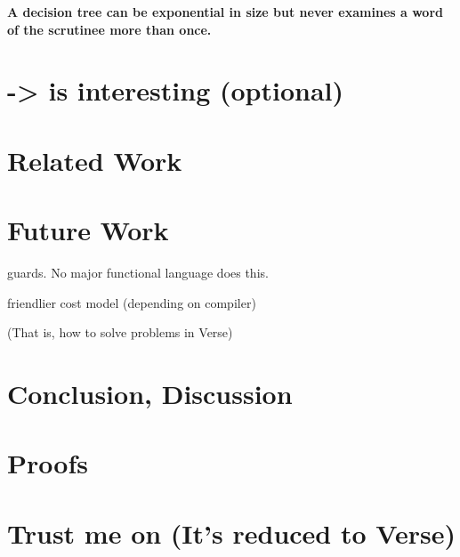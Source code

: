 \documentclass[manuscript,screen,review, 12pt]{acmart}
\begin{document}
    
    
    
    

    \bf{A decision tree can be exponential in size but never examines a word of
    the scrutinee more than once. }

    
    
    


\section{\PPlus -> \VMinus is interesting (optional)}

    
    
    
    


\section{Related Work}
\section{Future Work}

    
    
    
        guards. No major functional language does this. 
    
    friendlier cost model (depending on compiler)
    
        (That is, how to solve problems in Verse)
    


\section{Conclusion, Discussion}

\renewcommand\thesection{\Alph{section}}
\setcounter{section}{0}
\section{Proofs}

    
    
    


\section{Trust me on \VMinus (It's reduced to Verse)}

    
    
    
    
\end{document}
